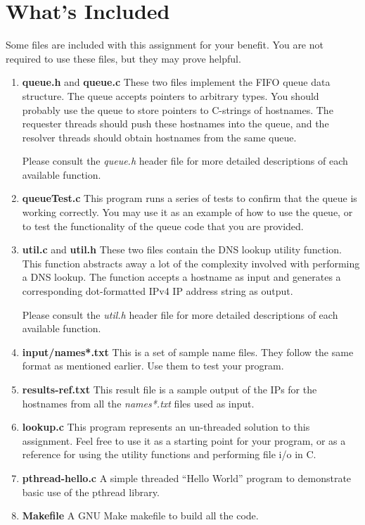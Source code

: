 \documentclass[12pt]{article}
\begin{document}
\section{What's Included}
Some files are included with this assignment for your benefit. You are
not required to use these files, but they may prove helpful.
\begin{enumerate}
\item {\bf queue.h} and {\bf queue.c} These two files implement the
  FIFO queue data structure. The queue accepts pointers to arbitrary
  types. You should probably use the queue to store pointers to
  C-strings of hostnames. The requester threads should push these
  hostnames into the
  queue, and the resolver threads should obtain hostnames from the same
  queue.

  Please consult the \textit{queue.h} header file for more detailed
  descriptions of each available function.

\item {\bf queueTest.c} This program runs a series of tests to confirm
  that the queue is working correctly. You may use it as an example of
  how to use the queue, or to test the functionality of the queue code
  that you are provided.

\item {\bf util.c} and {\bf util.h} These two files contain the DNS lookup
  utility function. This function abstracts away a lot of the
  complexity involved with performing a DNS lookup. The function
  accepts a hostname as input and generates a corresponding
  dot-formatted IPv4 IP address string as output.
  
  Please consult the \textit{util.h} header file for more detailed
  descriptions of each available function.
  
\item {\bf input/names*.txt} This is a set of sample name files.
  They follow the same format as mentioned earlier. Use them to test
  your program.

\item {\bf results-ref.txt} This result file is a sample output of the IPs
  for the hostnames from all the  \textit{names*.txt} files used as input.

\item {\bf lookup.c} This program represents an un-threaded solution to
  this assignment. Feel free to use it as a starting point for your
  program, or as a reference for using the utility functions and
  performing file i/o in C.

\item {\bf pthread-hello.c} A simple threaded ``Hello World'' program
  to demonstrate basic use of the pthread library.

\item {\bf Makefile} A GNU Make makefile to build all the code.

\end{enumerate}
\end{document}
